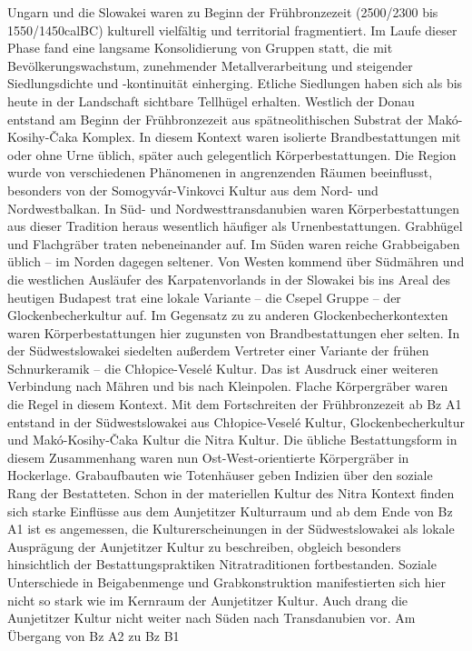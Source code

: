 \documentclass[openany,twoside,twocolumn]{book}
\begin{document}
Ungarn und die Slowakei waren zu Beginn der Frühbronzezeit (2500/2300
bis 1550/1450calBC) kulturell vielfältig und territorial fragmentiert.
Im Laufe dieser Phase fand eine langsame Konsolidierung von Gruppen
statt, die mit Bevölkerungswachstum, zunehmender Metallverarbeitung und
steigender Siedlungsdichte und -kontinuität einherging. Etliche
Siedlungen haben sich als bis heute in der Landschaft sichtbare
Tellhügel erhalten. Westlich der Donau entstand am Beginn der
Frühbronzezeit aus spätneolithischen Substrat der Makó-Kosihy-Čaka
Komplex. In diesem Kontext waren isolierte Brandbestattungen mit oder
ohne Urne üblich, später auch gelegentlich Körperbestattungen. Die
Region wurde von verschiedenen Phänomenen in angrenzenden Räumen
beeinflusst, besonders von der Somogyvár-Vinkovci Kultur aus dem Nord-
und Nordwestbalkan. In Süd- und Nordwesttransdanubien waren
Körperbestattungen aus dieser Tradition heraus wesentlich häufiger als
Urnenbestattungen. Grabhügel und Flachgräber traten nebeneinander auf.
Im Süden waren reiche Grabbeigaben üblich -- im Norden dagegen seltener.
Von Westen kommend über Südmähren und die westlichen Ausläufer des
Karpatenvorlands in der Slowakei bis ins Areal des heutigen Budapest
trat eine lokale Variante -- die Csepel Gruppe -- der
Glockenbecherkultur auf. Im Gegensatz zu zu anderen
Glockenbecherkontexten waren Körperbestattungen hier zugunsten von
Brandbestattungen eher selten. In der Südwestslowakei siedelten außerdem
Vertreter einer Variante der frühen Schnurkeramik -- die Chłopice-Veselé
Kultur. Das ist Ausdruck einer weiteren Verbindung nach Mähren und bis
nach Kleinpolen. Flache Körpergräber waren die Regel in diesem Kontext.
Mit dem Fortschreiten der Frühbronzezeit ab Bz A1 entstand in der
Südwestslowakei aus Chłopice-Veselé Kultur, Glockenbecherkultur und
Makó-Kosihy-Čaka Kultur die Nitra Kultur. Die übliche Bestattungsform in
diesem Zusammenhang waren nun Ost-West-orientierte Körpergräber in
Hockerlage. Grabaufbauten wie Totenhäuser geben Indizien über den
soziale Rang der Bestatteten. Schon in der materiellen Kultur des Nitra
Kontext finden sich starke Einflüsse aus dem Aunjetitzer Kulturraum und
ab dem Ende von Bz A1 ist es angemessen, die Kulturerscheinungen in der
Südwestslowakei als lokale Ausprägung der Aunjetitzer Kultur zu
beschreiben, obgleich besonders hinsichtlich der Bestattungspraktiken
Nitratraditionen fortbestanden. Soziale Unterschiede in Beigabenmenge
und Grabkonstruktion manifestierten sich hier nicht so stark wie im
Kernraum der Aunjetitzer Kultur. Auch drang die Aunjetitzer Kultur nicht
weiter nach Süden nach Transdanubien vor. Am Übergang von Bz A2 zu Bz B1
\end{document}
